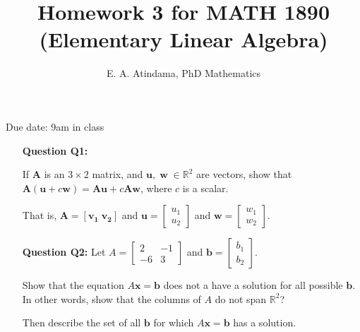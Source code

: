 \documentclass[a4paper,11pt,reqno]{amsart}
\title[MATH 1890 (Elementary Linear Algebra)]{Homework 3  for MATH 1890 (Elementary Linear Algebra)}
\author[Emmanuel Atindama]{E. A. Atindama, PhD Mathematics}
\numberwithin{equation}{section}
\begin{document}
\maketitle
Due date: 9am in class
\vspace{0.5cm}
\begin{enumerate}
\item[\textbf{Question Q1:}]

If \(\mathbf{A}\) is an \(3\times 2\) matrix, and \(\mathbf{u}, \;\mathbf{w} \; \in \mathbb{R}^2\) are vectors, show that \(\mathbf{A}(\mathbf{u} + c\mathbf{w}) = \mathbf{A}\mathbf{u} + c\mathbf{A}\mathbf{w}\), where \(c\) is a scalar.
    
\noindent That is, \(\mathbf{A} = [\mathbf{v_1} \; \mathbf{v_2} ]\) and 
            \( \mathbf{u} = 
           \begin{bmatrix}
               u_1\\
               u_2
           \end{bmatrix} \)
           and 
           \( \mathbf{w} = 
           \begin{bmatrix}
               w_1\\
               w_2
           \end{bmatrix} \).





\item[\textbf{Question Q2:}]
Let \(A= 
           \begin{bmatrix}
               2 & -1\\
              -6 &  3 
            \end{bmatrix} \)
and \( \mathbf{b}=
        \begin{bmatrix}
               b_1\\
               b_2
           \end{bmatrix}.
        \)

\noindent Show that the equation \(A\mathbf{x} = \mathbf{b} \) does not a have a solution for all possible \(\mathbf{b}\).
In other words, show that the columns of \(A\) do not span \(\mathbb{R}^2\)?

\noindent Then describe the set of all \(\mathbf{b}\) for which \(A\mathbf{x} = \mathbf{b} \) has a solution.

\end{enumerate}
\end{document}

